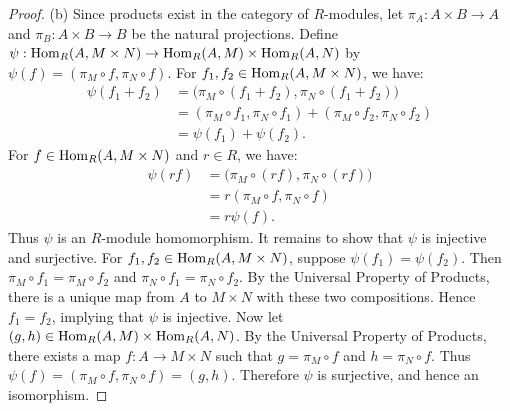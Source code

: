 \documentclass[10pt,oneside,openany]{memoir}
\begin{document}
{\begin{proof}
		(b) Since products exist in the category of $R$-modules, let $\pi_A:A \times B \rightarrow A$ and $\pi_B:A \times B \rightarrow B$ be the natural projections. Define $\psi:\operatorname{Hom}_R(A,M \times N) \rightarrow \operatorname{Hom}_R(A,M) \times \operatorname{Hom}_R(A,N)$ by $\psi(f) = (\pi_M \circ f, \pi_N \circ f)$. For $f_1,f_2 \in \operatorname{Hom}_R(A,M\times N)$, we have:
		\begin{align*}
			\psi(f_1+f_2)
			&= \bigl(\pi_M\circ(f_1+f_2),\pi_N\circ(f_1+f_2)\bigr) \\
			&= (\pi_M\circ f_1,\pi_N\circ f_1)
			  +(\pi_M\circ f_2,\pi_N\circ f_2) \\
			&= \psi(f_1)+\psi(f_2).
		\end{align*}
		For $f\in\operatorname{Hom}_R(A,M\times N)$ and $r\in R$, we have:
		\begin{align*}
			\psi(rf)
			&= \bigl(\pi_M\circ(rf),\pi_N\circ(rf)\bigr) \\
			&= r(\pi_M\circ f,\pi_N\circ f) \\
			&= r\psi(f).
		\end{align*}
		Thus $\psi$ is an $R$-module homomorphism. It remains to show that
		$\psi$ is injective and surjective. For $f_1,f_2\in\operatorname{Hom}_R(A,M\times N)$,
		suppose $\psi(f_1)=\psi(f_2)$. Then $\pi_M\circ f_1=\pi_M\circ f_2$ and $\pi_N\circ f_1=\pi_N\circ f_2$.	By the Universal Property of Products, there is a unique map from $A$ to
		$M\times N$ with these two compositions. Hence $f_1=f_2$, implying that
		$\psi$ is injective. Now let
		$(g,h)\in\operatorname{Hom}_R(A,M)\times\operatorname{Hom}_R(A,N)$. By the Universal Property of
		Products, there exists a map $f:A\to M\times N$ such that
		$g=\pi_M\circ f$ and $h=\pi_N\circ f$. Thus $\psi(f)=(\pi_M\circ f,\pi_N\circ f)=(g,h)$. Therefore $\psi$ is surjective, and hence an isomorphism.
	\end{proof}}
\end{document}

